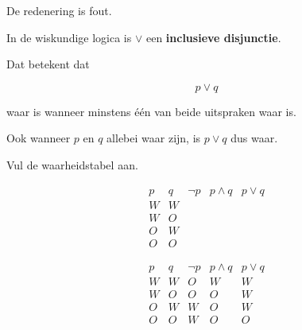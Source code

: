 \documentclass{ximera}
\begin{document}
\begin{oefening}{\oefB \ESS}
\begin{question}
\begin{oplossing}
De redenering is fout.

In de wiskundige logica is $\lor$ een \textbf{inclusieve disjunctie}.

Dat betekent dat

\[
p\lor q
\]

waar is wanneer minstens één van beide uitspraken waar is.

Ook wanneer $p$ en $q$ allebei waar zijn, is $p\lor q$ dus waar.

\end{oplossing}

\end{question}

\end{oefening}





\begin{oefening}{\oefB \ESS}

Vul de waarheidstabel aan.

\[
\begin{array}{c|c|c|c|c}
p&q&\neg p&p\land q&p\lor q\\
\hline
W&W&\phantom{O}&\phantom{W}&\phantom{W}\\
W&O&\phantom{O}&\phantom{O}&\phantom{W}\\
O&W&\phantom{W}&\phantom{O}&\phantom{W}\\
O&O&\phantom{W}&\phantom{O}&\phantom{O}
\end{array}
\]

\begin{oplossing}

\[
\begin{array}{c|c|c|c|c}
p&q&\neg p&p\land q&p\lor q\\
\hline
W&W&O&W&W\\
W&O&O&O&W\\
O&W&W&O&W\\
O&O&W&O&O
\end{array}
\]

\end{oplossing}

\end{oefening}
\end{document}
